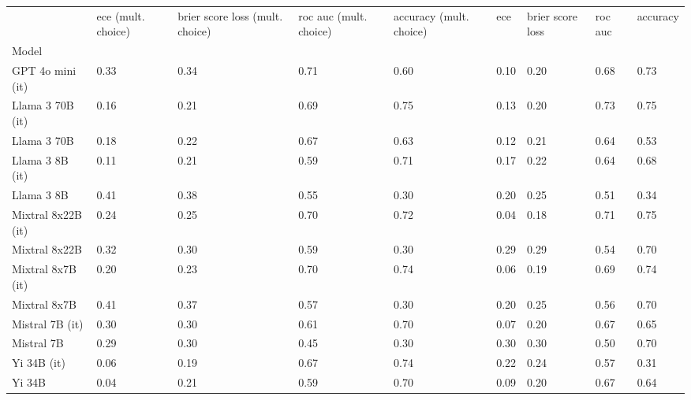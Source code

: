 \begin{tabular}{lllllllll}
\toprule
 & ece (mult. choice) & brier score loss (mult. choice) & roc auc (mult. choice) & accuracy (mult. choice) & ece & brier score loss & roc auc & accuracy \\
Model &  &  &  &  &  &  &  &  \\
\midrule
GPT 4o mini (it) & 0.33 & 0.34 & \cellcolor{cyan!25.0} 0.71 & 0.60 & 0.10 & 0.20 & 0.68 & \cellcolor{cyan!17.6} 0.73 \\
Llama 3 70B (it) & 0.16 & \cellcolor{cyan!16.2} 0.21 & \cellcolor{cyan!7.0} 0.69 & \cellcolor{cyan!25.0} 0.75 & 0.13 & 0.20 & \cellcolor{cyan!25.0} 0.73 & \cellcolor{cyan!24.4} 0.75 \\
Llama 3 70B & 0.18 & \cellcolor{cyan!8.3} 0.22 & 0.67 & 0.63 & 0.12 & 0.21 & 0.64 & 0.53 \\
Llama 3 8B (it) & 0.11 & \cellcolor{cyan!12.7} 0.21 & 0.59 & \cellcolor{cyan!7.7} 0.71 & 0.17 & 0.22 & 0.64 & 0.68 \\
Llama 3 8B & 0.41 & 0.38 & 0.55 & \cellcolor{orange!25.0} 0.30 & 0.20 & 0.25 & 0.51 & \cellcolor{orange!6.2} 0.34 \\
Mixtral 8x22B (it) & 0.24 & 0.25 & \cellcolor{cyan!11.7} 0.70 & \cellcolor{cyan!12.7} 0.72 & \cellcolor{cyan!25.0} 0.04 & \cellcolor{cyan!25.0} 0.18 & \cellcolor{cyan!11.0} 0.71 & \cellcolor{cyan!25.0} 0.75 \\
Mixtral 8x22B & 0.32 & 0.30 & 0.59 & \cellcolor{orange!25.0} 0.30 & \cellcolor{orange!15.5} 0.29 & \cellcolor{orange!3.4} 0.29 & 0.54 & \cellcolor{cyan!0.5} 0.70 \\
Mixtral 8x7B (it) & 0.20 & \cellcolor{cyan!7.4} 0.23 & \cellcolor{cyan!12.7} 0.70 & \cellcolor{cyan!23.3} 0.74 & \cellcolor{cyan!0.3} 0.06 & \cellcolor{cyan!18.5} 0.19 & 0.69 & \cellcolor{cyan!22.2} 0.74 \\
Mixtral 8x7B & 0.41 & 0.37 & 0.57 & \cellcolor{orange!25.0} 0.30 & 0.20 & 0.25 & 0.56 & 0.70 \\
Mistral 7B (it) & 0.30 & 0.30 & 0.61 & \cellcolor{cyan!0.4} 0.70 & 0.07 & 0.20 & 0.67 & 0.65 \\
Mistral 7B & 0.29 & 0.30 & \cellcolor{orange!25.0} 0.45 & \cellcolor{orange!25.0} 0.30 & \cellcolor{orange!22.1} 0.30 & \cellcolor{orange!18.5} 0.30 & 0.50 & 0.70 \\
Yi 34B (it) & \cellcolor{cyan!16.7} 0.06 & \cellcolor{cyan!25.0} 0.19 & 0.67 & \cellcolor{cyan!19.4} 0.74 & 0.22 & 0.24 & 0.57 & \cellcolor{orange!25.0} 0.31 \\
Yi 34B & \cellcolor{cyan!25.0} 0.04 & \cellcolor{cyan!17.2} 0.21 & 0.59 & \cellcolor{cyan!2.1} 0.70 & 0.09 & 0.20 & 0.67 & 0.64 \\

\end{tabular}
